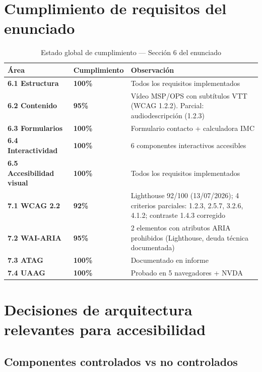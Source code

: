 \documentclass[12pt, a4paper]{article}
\begin{document}
\section{Cumplimiento de requisitos del enunciado}

\begin{table}[H]
\centering
\caption{Estado global de cumplimiento --- Sección 6 del enunciado}
\begin{tabular}{@{}>{\bfseries}p{4cm} >{\centering\arraybackslash}p{2.5cm} p{7cm}@{}}
\toprule
\rowcolor{royalblue!12}
\textbf{Área} & \textbf{Cumplimiento} & \textbf{Observación} \\
\midrule
6.1 Estructura & \textcolor{successgreen}{\bfseries 100\%} & Todos los requisitos implementados \\
6.2 Contenido & \textcolor{successgreen}{\bfseries 95\%} & Vídeo MSP/OPS con subtítulos VTT (WCAG 1.2.2). Parcial: audiodescripción (1.2.3) \\
6.3 Formularios & \textcolor{successgreen}{\bfseries 100\%} & Formulario contacto + calculadora IMC \\
6.4 Interactividad & \textcolor{successgreen}{\bfseries 100\%} & 6 componentes interactivos accesibles \\
6.5 Accesibilidad visual & \textcolor{successgreen}{\bfseries 100\%} & Todos los requisitos implementados \\
7.1 WCAG 2.2 & \textcolor{warningyellow}{\bfseries 92\%} & Lighthouse 92/100 (13/07/2026); 4 criterios parciales: 1.2.3, 2.5.7, 3.2.6, 4.1.2; contraste 1.4.3 corregido \\
7.2 WAI-ARIA & \textcolor{warningyellow}{\bfseries 95\%} & 2 elementos con atributos ARIA prohibidos (Lighthouse, deuda técnica documentada) \\
7.3 ATAG & \textcolor{successgreen}{\bfseries 100\%} & Documentado en informe \\
7.4 UAAG & \textcolor{successgreen}{\bfseries 100\%} & Probado en 5 navegadores + NVDA \\
\bottomrule
\end{tabular}
\end{table}

\section{Decisiones de arquitectura relevantes para accesibilidad}

\subsection{Componentes controlados vs no controlados}
\end{document}
